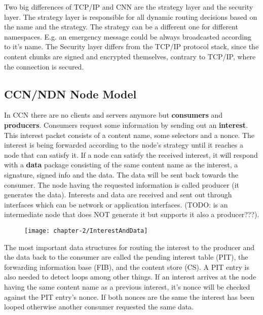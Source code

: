 \vspace{5mm} %

Two big differences of TCP/IP and CNN are the strategy layer and the security layer. The strategy layer is responsible for all dynamic routing decisions based on the name and the strategy. The strategy can be a different one for different namespaces. E.g. an emergency message could be always broadcasted according to it's name. The Security layer differs from the TCP/IP protocol stack, since the content chunks are signed and encrypted themselves, contrary to TCP/IP, where the connection is secured.

\subsection{CCN/NDN Node Model}

In CCN there are no clients and servers anymore but \textbf{consumers} and \textbf{producers}. Consumers request some information by sending out an \textbf{interest}. This interest packet consists of a content name, some selectors and a nonce. The interest is being forwarded according to the node's strategy until it reaches a node that can satisfy it. If a node can satisfy the received interest, it will respond with a \textbf{data} package consisting of the same content name as the interest, a signature, signed info and the data. The data will be sent back towards the consumer. The node having the requested information is called producer (it generates the data). Interests and data are received and sent out through interfaces which can be network or application interfaces. (TODO: is an intermediate node that does NOT generate it but supports it also a producer???).

\begin{figure}[H]
\texttt{[image: chapter-2/InterestAndData]}
\centering
\end{figure}

The most important data structures for routing the interest to the producer and the data back to the consumer are called the pending interest table (PIT), the forwarding information base (FIB), and the content store (CS). A PIT entry is also needed to detect loops among other things. If an interest arrives at the node having the same content name as a previous interest, it's nonce will be checked against the PIT entry's nonce. If both nonces are the same the interest has been looped otherwise another consumer requested the same data.

